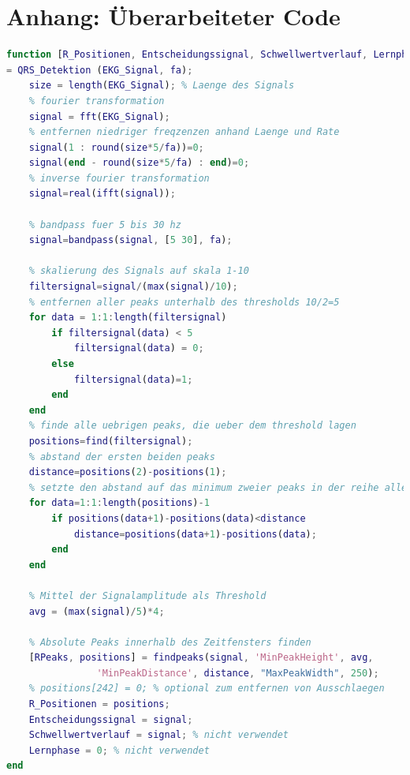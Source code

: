 \documentclass[a4paper,12pt,titlepage]{scrartcl}
\begin{document}
\listoffigures

\newpage
\section{Anhang: Überarbeiteter Code}
\begin{lstlisting}[basicstyle=\scriptsize, language=matlab]
function [R_Positionen, Entscheidungssignal, Schwellwertverlauf, Lernphase] 
= QRS_Detektion (EKG_Signal, fa);
    size = length(EKG_Signal); % Laenge des Signals
    % fourier transformation
    signal = fft(EKG_Signal);
    % entfernen niedriger freqzenzen anhand Laenge und Rate
    signal(1 : round(size*5/fa))=0;
    signal(end - round(size*5/fa) : end)=0;
    % inverse fourier transformation
    signal=real(ifft(signal));
    
    % bandpass fuer 5 bis 30 hz
    signal=bandpass(signal, [5 30], fa);
    
    % skalierung des Signals auf skala 1-10
    filtersignal=signal/(max(signal)/10);
    % entfernen aller peaks unterhalb des thresholds 10/2=5
    for data = 1:1:length(filtersignal)
        if filtersignal(data) < 5
            filtersignal(data) = 0;
        else
            filtersignal(data)=1;
        end
    end
    % finde alle uebrigen peaks, die ueber dem threshold lagen
    positions=find(filtersignal);
    % abstand der ersten beiden peaks
    distance=positions(2)-positions(1);
    % setzte den abstand auf das minimum zweier peaks in der reihe aller uebrigen peaks
    for data=1:1:length(positions)-1
        if positions(data+1)-positions(data)<distance
            distance=positions(data+1)-positions(data);
        end
    end
    
    % Mittel der Signalamplitude als Threshold
    avg = (max(signal)/5)*4; 
    
    % Absolute Peaks innerhalb des Zeitfensters finden
    [RPeaks, positions] = findpeaks(signal, 'MinPeakHeight', avg, 
                'MinPeakDistance', distance, "MaxPeakWidth", 250);
    % positions[242] = 0; % optional zum entfernen von Ausschlaegen
    R_Positionen = positions;
    Entscheidungssignal = signal;
    Schwellwertverlauf = signal; % nicht verwendet
    Lernphase = 0; % nicht verwendet
end
\end{lstlisting}
\end{document}
